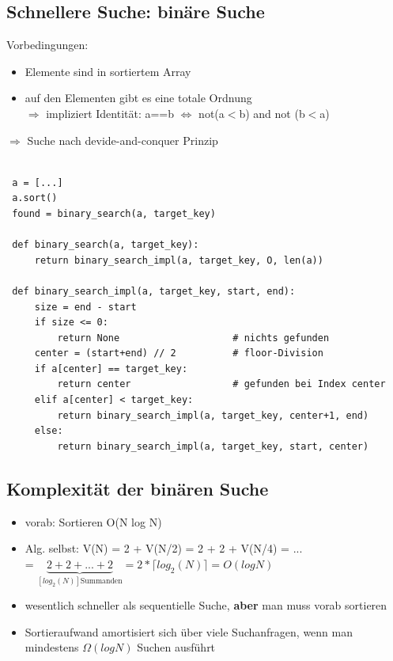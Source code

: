         \subsection*{Schnellere Suche: binäre Suche}
        Vorbedingungen:
        \begin{itemize}
            \item Elemente sind in sortiertem Array
            \item auf den Elementen gibt es eine totale Ordnung \\
            $\Rightarrow$ impliziert Identität: a==b $\Leftrightarrow$ not(a$<$b) and not (b$<$a)
        \end{itemize}

        $\Rightarrow$ Suche nach devide-and-conquer Prinzip\\
        \begin{verbatim}

 a = [...]
 a.sort()
 found = binary_search(a, target_key)

 def binary_search(a, target_key):
     return binary_search_impl(a, target_key, O, len(a))

 def binary_search_impl(a, target_key, start, end):
     size = end - start
     if size <= 0:
         return None                    # nichts gefunden
     center = (start+end) // 2          # floor-Division
     if a[center] == target_key:
         return center                  # gefunden bei Index center
     elif a[center] < target_key:
         return binary_search_impl(a, target_key, center+1, end)
     else:
         return binary_search_impl(a, target_key, start, center)
        \end{verbatim}

        \subsection*{Komplexität der binären Suche}

        \begin{itemize}
            \item vorab: Sortieren O(N log N)
            \item Alg. selbst: V(N) = 2 + V(N/2) = 2 + 2 + V(N/4) = ...\\
            \hspace*{3cm} = $\underbrace{ 2 + 2 + ... + 2}_{[ log_2(N)] \text{Summanden}} = 2* \lceil log_2 (N) \rceil = O(logN)$
        \end{itemize}
        \begin{itemize}[label={$\Rightarrow$}]
            \item wesentlich schneller als sequentielle Suche, \textbf{aber} man muss vorab sortieren
            \item Sortieraufwand amortisiert sich über viele Suchanfragen, wenn man mindestens $\Omega(log N)$ Suchen ausführt
        \end{itemize}


